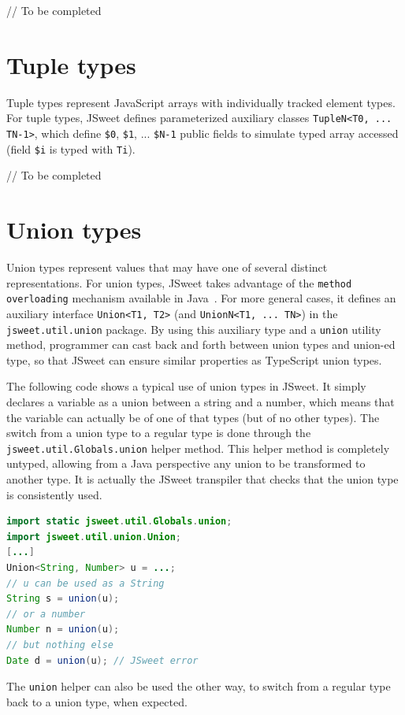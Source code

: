 \documentclass[a4paper]{report}
\begin{document}
// To be completed

\section{Tuple types}

Tuple types represent JavaScript arrays with individually tracked element types. For tuple types, JSweet defines parameterized auxiliary classes \texttt{TupleN<T0, ... TN-1>}, which define \texttt{\$0}, \texttt{\$1}, ... \texttt{\$N-1} public fields to simulate typed array accessed (field \texttt{\$i} is typed with \texttt{Ti}).

// To be completed

\section{Union types}

Union types represent values that may have one of several distinct representations. For union types, JSweet takes advantage of the \texttt{method overloading} mechanism available in Java~\cite{gil2010use}. For more general cases, it defines an auxiliary interface \texttt{Union<T1, T2>} (and \texttt{UnionN<T1, ... TN>}) in the \texttt{jsweet.\-util.\-union} package. By using this auxiliary type and a \texttt{union} utility method, programmer can cast back and forth between union types and union-ed type, so that JSweet can ensure similar properties as TypeScript union types. 

The following code shows a typical use of union types in JSweet. It simply declares a variable as a union between a string and a number, which means that the variable can actually be of one of that types (but of no other types). The switch from a union type to a regular type is done through the \texttt{jsweet\-.util\-.Globals\-.union} helper method. This helper method is completely untyped, allowing from a Java perspective any union to be transformed to another type. It is actually the JSweet transpiler that checks that the union type is consistently used.

\begin{lstlisting}[language=Java]
import static jsweet.util.Globals.union;
import jsweet.util.union.Union;
[...]
Union<String, Number> u = ...;
// u can be used as a String
String s = union(u);
// or a number
Number n = union(u);
// but nothing else
Date d = union(u); // JSweet error
\end{lstlisting}

The \texttt{union} helper can also be used the other way, to switch from a regular type back to a union type, when expected.
\end{document}
